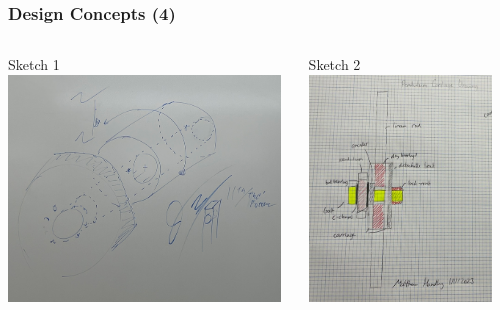 \documentclass[aspectratio=169]{beamer}
\begin{document}
\begin{frame}
    \frametitle{Design Concepts (4)}

    \begin{columns}
        \begin{column}{0.48\textwidth}
            \begin{block}{Sketch 1}
                \includegraphics[height=6cm]{Tension}
            \end{block}
        \end{column}

        \begin{column}{0.32\textwidth}
            \begin{block}{Sketch 2}
                \includegraphics[height=6cm]{Carriage}
            \end{block}
        \end{column}
    \end{columns}
\end{frame}
\end{document}

